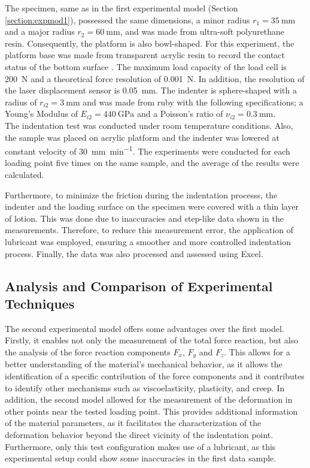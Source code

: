 The specimen, same as in the first experimental model (Section \ref{section:expmod1}),
 possessed the same dimensions, a minor radius $r_1 = \SI{35}{\milli \m}$ and a major 
 radius $r_2 = \SI{60}{\milli \m}$, and was
made from ultra-soft polyurethane resin. Consequently, the platform is also 
bowl-shaped. For this experiment, the platform base was made from transparent 
acrylic resin to record the contact status of the bottom surface \cite{Mori2022}. 
The maximum load capacity of the load cell is \SI{200}{\newton} and a theoretical 
force resolution of \SI{0.001}{\newton}. In addition, the resolution of the 
laser displacement sensor is \SI{0.05}{\milli \m}.
The indenter is sphere-shaped with a radius of $r_{i2} = \SI{3}{\milli \m}$ and
was made from ruby with the following specifications; 
a Young's Modulus of $E_{i2} = \SI{440}{\giga \pascal}$ and a Poisson's ratio of 
$\nu_{i2} = \SI{0.3}{\milli \m}$.\\

The indentation test was conducted under room temperature conditions. Also, 
the sample was placed on acrylic platform and the indenter was 
lowered at constant velocity of \SI[per-mode = symbol]{30}{\milli \m\per \minute}. 
The experiments were conducted for each loading point five times on the same sample, 
and the average of the results were calculated.

Furthermore, to minimize the friction during the indentation processs, the indenter 
and the loading surface on the specimen were covered with a thin layer of lotion. 
This was done due to inaccuracies and step-like data shown in the measurements. Therefore, to reduce 
this measurement error, the application of lubricant was employed, ensuring a 
smoother and more controlled indentation process. Finally, the data 
was also processed and assessed using Excel.

\subsection*{Analysis and Comparison of Experimental Techniques}

The second experimental model offers some advantages over the first model. 
Firstly, it enables not only the measurement of the total force reaction, but also the analysis 
of the force reaction components $F_x$, $F_y$ and $F_z$. This allows for a better 
understanding of the material's mechanical behavior, as it allows the identification 
of a specific contribution of the force components and it contributes to identify other 
mechanisms such as viscoelasticity, plasticity, and creep. 
In addition, the second model allowed for the measurement of the deformation in other 
points near the tested loading point. This provides additional information of the 
material parameters, as it facilitates the characterization of the deformation behavior beyond the 
direct vicinity of the indentation point. Furthermore, only this test configuration makes 
use of a lubricant, as this experimental setup could show some inaccuracies in the first data sample.

